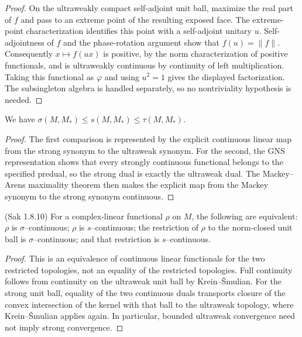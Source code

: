 \begin{proof}
  \leanok
  On the ultraweakly compact self-adjoint unit ball, maximize the real part of $f$ and pass to an
  extreme point of the resulting exposed face. The extreme-point characterization identifies this
  point with a self-adjoint unitary $u$. Self-adjointness of $f$ and the phase-rotation argument show
  that $f(u)=\lVert f\rVert$. Consequently $x\mapsto f(ux)$ is positive, by the norm characterization
  of positive functionals, and is ultraweakly continuous by continuity of left multiplication.
  Taking this functional as $\varphi$ and using $u^{2}=1$ gives the displayed factorization. The
  subsingleton algebra is handled separately, so no nontriviality hypothesis is needed.
\end{proof}

\begin{theorem}
  \label{thm:sigma_le_s_le_tau}
  \leanok
  We have $\sigma(M,M_{*})\le s(M,M_{*})\le \tau(M,M_{*})$.
\end{theorem}

\begin{proof}
  \leanok
  The first comparison is represented by the explicit continuous linear map from the strong
  synonym to the ultraweak synonym.  For the second, the GNS representation shows that every
  strongly continuous functional belongs to the specified predual, so the strong dual is exactly
  the ultraweak dual.  The Mackey--Arens maximality theorem then makes the explicit map from the
  Mackey synonym to the strong synonym continuous.
\end{proof}

\begin{lemma}
  \label{lem:bdd_sigma_cts_iff_bdd_s_cts_Sak_1_8_10} (Sak 1.8.10)
  \leanok
  For a complex-linear functional $\rho$ on $M$, the following are equivalent: $\rho$ is
  $\sigma$--continuous; $\rho$ is $s$--continuous; the restriction of $\rho$ to the norm-closed
  unit ball is $\sigma$--continuous; and that restriction is $s$--continuous.
\end{lemma}

\begin{proof}
  \leanok
  This is an equivalence of continuous linear functionals for the two restricted topologies, not
  an equality of the restricted topologies.  Full continuity follows from continuity on the
  ultraweak unit ball by Krein--Šmulian.  For the strong unit ball, equality of the two continuous
  duals transports closure of the convex intersection of the kernel with that ball to the
  ultraweak topology, where Krein--Šmulian applies again.  In particular, bounded ultraweak
  convergence need not imply strong convergence.
\end{proof}
